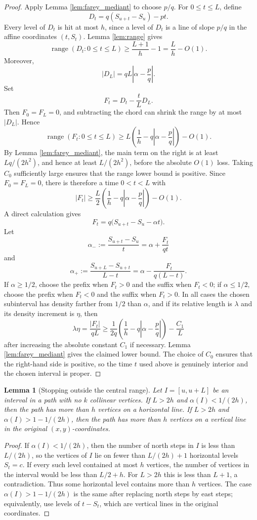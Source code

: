\documentclass[10pt,a4paper]{amsart}
\newtheorem{lemma}[theorem]{Lemma}
\newcommand{\range}{\operatorname{range}}
\newcommand{\1}{\mathbf 1}
\begin{document}
\begin{proof}
Apply Lemma \ref{lem:farey_mediant} to choose $p/q$. For $0\le t\le L$, define
\[
D_t=q(S_{u+t}-S_u)-pt.
\]
Every level of $D_t$ is hit at most $h$, since a level of $D_t$ is a line of slope $p/q$ in the affine coordinates $(t,S_t)$. Lemma \ref{lem:range} gives
\[
\range(D_t:0\le t\le L)\ge \frac{L+1}{h}-1=\frac Lh-O(1).
\]
Moreover,
\[
|D_L|=qL\left|\alpha-\frac pq\right|.
\]
Set
\[
F_t=D_t-\frac{t}{L}D_L.
\]
Then $F_0=F_L=0$, and subtracting the chord can shrink the range by at most $|D_L|$. Hence
\[
\range(F_t:0\le t\le L)
\ge L\left(\frac1h-q\left|\alpha-\frac pq\right|\right)-O(1).
\]
By Lemma \ref{lem:farey_mediant}, the main term on the right is at least $Lq/(2h^2)$, and hence at least $L/(2h^2)$, before the absolute $O(1)$ loss.  Taking $C_0$ sufficiently large ensures that the range lower bound is positive.  Since $F_0=F_L=0$, there is therefore a time $0<t<L$ with
\[
|F_t|\ge \frac L2\left(\frac1h-q\left|\alpha-\frac pq\right|\right)-O(1).
\]
A direct calculation gives
\[
F_t=q\bigl(S_{u+t}-S_u-\alpha t\bigr).
\]
Let
\[
\alpha_-:=\frac{S_{u+t}-S_u}{t}=\alpha+\frac{F_t}{qt}
\]
and
\[
\alpha_+:=\frac{S_{u+L}-S_{u+t}}{L-t}=\alpha-\frac{F_t}{q(L-t)}.
\]
If $\alpha\ge1/2$, choose the prefix when $F_t>0$ and the suffix when $F_t<0$; if $\alpha\le1/2$, choose the prefix when $F_t<0$ and the suffix when $F_t>0$. In all cases the chosen subinterval has density farther from $1/2$ than $\alpha$, and if its relative length is $\lambda$ and its density increment is $\eta$, then
\[
\lambda\eta=\frac{|F_t|}{qL}
\ge \frac1{2q}\left(\frac1h-q\left|\alpha-\frac pq\right|\right)-\frac{C_1}{L}
\]
after increasing the absolute constant $C_1$ if necessary.  Lemma \ref{lem:farey_mediant} gives the claimed lower bound.  The choice of $C_0$ ensures that the right-hand side is positive, so the time $t$ used above is genuinely interior and the chosen interval is proper.
\end{proof}

\begin{lemma}[Stopping outside the central range]\label{lem:stop}
Let $I=[u,u+L]$ be an interval in a path with no $k$ collinear vertices. If $L>2h$ and $\alpha(I)<1/(2h)$, then the path has more than $h$ vertices on a horizontal line. If $L>2h$ and $\alpha(I)>1-1/(2h)$, then the path has more than $h$ vertices on a vertical line in the original $(x,y)$-coordinates.
\end{lemma}

\begin{proof}
If $\alpha(I)<1/(2h)$, then the number of north steps in $I$ is less than $L/(2h)$, so the vertices of $I$ lie on fewer than $L/(2h)+1$ horizontal levels $S_t=c$. If every such level contained at most $h$ vertices, the number of vertices in the interval would be less than $L/2+h$. For $L>2h$ this is less than $L+1$, a contradiction. Thus some horizontal level contains more than $h$ vertices. The case $\alpha(I)>1-1/(2h)$ is the same after replacing north steps by east steps; equivalently, use levels of $t-S_t$, which are vertical lines in the original coordinates.
\end{proof}
\end{document}
